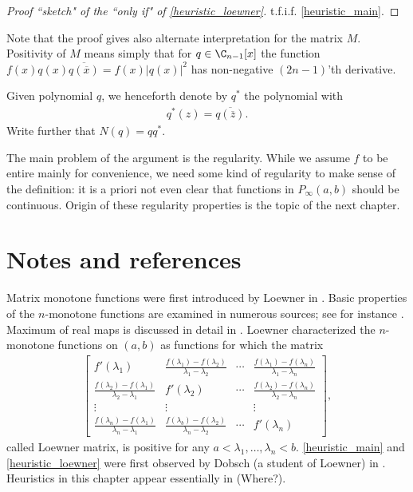 \begin{proof}[Proof ``sketch" of the ``only if" of \ref{heuristic_loewner}]
	t.f.i.f. \ref{heuristic_main}.
\end{proof}

Note that the proof gives also alternate interpretation for the matrix $M$. Positivity of $M$ means simply that for $q \in \C_{n - 1}[x]$ the function $f(x) q(x) \overline{q(\overline{x})} = f(x) |q(x)|^2$ has non-negative $(2 n - 1)$'th derivative.

Given polynomial $q$, we henceforth denote by $q^{*}$ the polynomial with
\begin{align*}
	q^{*}(z) = \overline{q(\overline{z})}.
\end{align*}
Write further that $N(q) = q q^{*}$.

The main problem of the argument is the regularity. While we assume $f$ to be entire mainly for convenience, we need some kind of regularity to make sense of the definition: it is a priori not even clear that functions in $P_{\infty}(a, b)$ should be continuous. Origin of these regularity properties is the topic of the next chapter.

\section{Notes and references}

Matrix monotone functions were first introduced by Loewner in \cite{Low}. Basic properties of the $n$-monotone functions are examined in numerous sources; see for instance \cite{Hiai}. Maximum of real maps is discussed in detail in \cite{Ando2}. Loewner characterized the $n$-monotone functions on $(a, b)$ as functions for which the matrix
\begin{align*}
	\begin{bmatrix}
		f'(\lambda_{1}) & \frac{f(\lambda_{1}) - f(\lambda_{2})}{\lambda_{1} - \lambda_{2}} & \cdots & \frac{f(\lambda_{1}) - f(\lambda_{n})}{\lambda_{1} - \lambda_{n}} \\
		\frac{f(\lambda_{2}) - f(\lambda_{1})}{\lambda_{2} - \lambda_{1}} & f'(\lambda_{2}) & \cdots & \frac{f(\lambda_{2}) - f(\lambda_{n})}{\lambda_{2} - \lambda_{n}} \\
		\vdots & \vdots & & \vdots \\
		\frac{f(\lambda_{n}) - f(\lambda_{1})}{\lambda_{n} - \lambda_{1}} & \frac{f(\lambda_{b}) - f(\lambda_{2})}{\lambda_{n} - \lambda_{2}} & \cdots & f'(\lambda_{n}) 
	\end{bmatrix},
\end{align*}
called Loewner matrix, is positive for any $a < \lambda_{1}, \ldots, \lambda_{n} < b$. \ref{heuristic_main} and \ref{heuristic_loewner} were first observed by Dobsch (a student of Loewner) in \cite{Dob}. Heuristics in this chapter appear essentially in (Where?).



